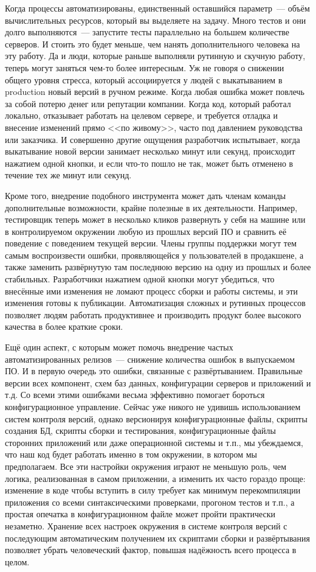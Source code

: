 \documentclass{../../text-style}
\begin{document}
Когда процессы автоматизированы, единственный оставшийся параметр~--- объём вычислительных ресурсов, который вы выделяете на задачу. Много тестов и они долго выполняются~--- запустите тесты параллельно на большем количестве серверов. И стоить это будет меньше, чем нанять дополнительного человека на эту работу. Да и люди, которые раньше выполняли рутинную и скучную работу, теперь могут заняться чем-то более интересным. Уж не говоря о снижении общего уровня стресса, который ассоциируется у людей с выкатыванием в production новый версий в ручном режиме. Когда любая ошибка может повлечь за собой потерю денег или репутации компании. Когда код, который работал локально, отказывает работать на целевом сервере, и требуется отладка и внесение изменений прямо <<по живому>>, часто под давлением руководства или заказчика. И совершенно другие ощущения разработчик испытывает, когда выкатывание новой версии занимает несколько минут или секунд, происходит нажатием одной кнопки, и если что-то пошло не так, может быть отменено в течение тех же минут или секунд.

Кроме того, внедрение подобного инструмента может дать членам команды дополнительные возможности, крайне полезные в их деятельности. Например, тестировщик теперь может в несколько кликов развернуть у себя на машине или в контролируемом окружении любую из прошлых версий ПО и сравнить её поведение с поведением текущей версии. Члены группы поддержки могут тем самым воспроизвести ошибки, проявляющейся у пользователей в продакшене, а также заменить развёрнутую там последнюю версию на одну из прошлых и более стабильных. Разработчики нажатием одной кнопки могут убедиться, что внесённые ими изменения не ломают процесс сборки и работы системы, и эти изменения готовы к публикации. Автоматизация сложных и рутинных процессов позволяет людям работать продуктивнее и производить продукт более высокого качества в более краткие сроки.

Ещё один аспект, с которым может помочь внедрение частых автоматизированных релизов~--- снижение количества ошибок в выпускаемом ПО. И в первую очередь это ошибки, связанные с развёртыванием. Правильные версии всех компонент, схем баз данных, конфигурации серверов и приложений и т.д. Со всеми этими ошибками весьма эффективно помогает бороться конфигурационное управление. Сейчас уже никого не удивишь использованием систем контроля версий, однако версионируя конфигурационные файлы, скрипты создания БД, скрипты сборки и тестирования, конфигурационные файлы сторонних приложений или даже операционной системы и т.п., мы убеждаемся, что наш код будет работать именно в том окружении, в котором мы предполагаем. Все эти настройки окружения играют не меньшую роль, чем логика, реализованная в самом приложении, а изменить их часто гораздо проще: изменение в коде чтобы вступить в силу требует как минимум перекомпиляции приложения со всеми синтаксическими проверками, прогоном тестов и т.п., а простая опечатка в конфигурационном файле может пройти практически незаметно. Хранение всех настроек окружения в системе контроля версий с последующим автоматическим получением их скриптами сборки и развёртывания позволяет убрать человеческий фактор, повышая надёжность всего процесса в целом.
\end{document}
